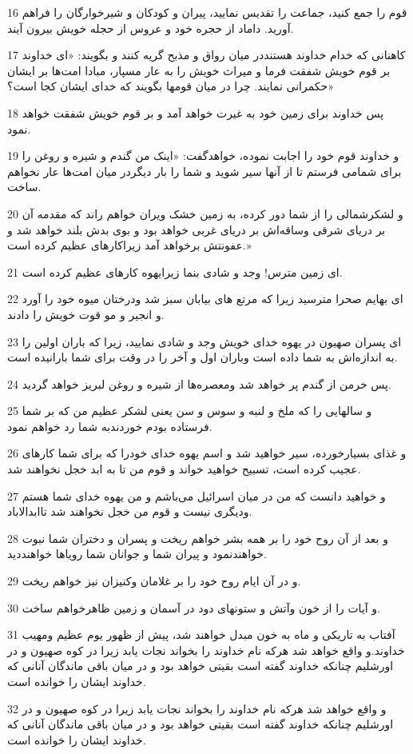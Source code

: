 \par 16 قوم را جمع کنید، جماعت را تقدیس نمایید، پیران و کودکان و شیرخوارگان را فراهم آورید. داماد از حجره خود و عروس از حجله خویش بیرون آیند.
\par 17 کاهنانی که خدام خداوند هستنددر میان رواق و مذبح گریه کنند و بگویند: «ای خداوند بر قوم خویش شفقت فرما و میراث خویش را به عار مسپار، مبادا امت‌ها بر ایشان حکمرانی نمایند. چرا در میان قومها بگویند که خدای ایشان کجا است؟»
\par 18 پس خداوند برای زمین خود به غیرت خواهد آمد و بر قوم خویش شفقت خواهد نمود.
\par 19 و خداوند قوم خود را اجابت نموده، خواهدگفت: «اینک من گندم و شیره و روغن را برای شمامی فرستم تا از آنها سیر شوید و شما را بار دیگردر میان امت‌ها عار نخواهم ساخت.
\par 20 و لشکرشمالی را از شما دور کرده، به زمین خشک ویران خواهم راند که مقدمه آن بر دریای شرقی وساقه‌اش بر دریای غربی خواهد بود و بوی بدش بلند خواهد شد و عفونتش برخواهد آمد زیراکارهای عظیم کرده است.»
\par 21 ‌ای زمین مترس! وجد و شادی بنما زیرایهوه کارهای عظیم کرده است.
\par 22 ‌ای بهایم صحرا مترسید زیرا که مرتع های بیابان سبز شد ودرختان میوه خود را آورد و انجیر و مو قوت خویش را دادند.
\par 23 ‌ای پسران صهیون در یهوه خدای خویش وجد و شادی نمایید، زیرا که باران اولین را به اندازه‌اش به شما داده است وباران اول و آخر را در وقت برای شما بارانیده است.
\par 24 پس خرمن از گندم پر خواهد شد ومعصره‌ها از شیره و روغن لبریز خواهد گردید.
\par 25 و سالهایی را که ملخ و لنبه و سوس و سن یعنی لشکر عظیم من که بر شما فرستاده بودم خوردندبه شما رد خواهم نمود.
\par 26 و غذای بسیارخورده، سیر خواهید شد و اسم یهوه خدای خودرا که برای شما کارهای عجیب کرده است، تسبیح خواهید خواند و قوم من تا به ابد خجل نخواهند شد.
\par 27 و خواهید دانست که من در میان اسرائیل می‌باشم و من یهوه خدای شما هستم ودیگری نیست و قوم من خجل نخواهند شد تاابدالاباد.
\par 28 و بعد از آن روح خود را بر همه بشر خواهم ریخت و پسران و دختران شما نبوت خواهندنمود و پیران شما و جوانان شما رویاها خواهنددید.
\par 29 و در آن ایام روح خود را بر غلامان وکنیزان نیز خواهم ریخت.
\par 30 و آیات را از خون وآتش و ستونهای دود در آسمان و زمین ظاهرخواهم ساخت.
\par 31 آفتاب به تاریکی و ماه به خون مبدل خواهند شد، پیش از ظهور یوم عظیم ومهیب خداوند.و واقع خواهد شد هر‌که نام خداوند را بخواند نجات یابد زیرا در کوه صهیون و در اورشلیم چنانکه خداوند گفته است بقیتی خواهد بود و در میان باقی ماندگان آنانی که خداوند ایشان را خوانده است.
\par 32 و واقع خواهد شد هر‌که نام خداوند را بخواند نجات یابد زیرا در کوه صهیون و در اورشلیم چنانکه خداوند گفته است بقیتی خواهد بود و در میان باقی ماندگان آنانی که خداوند ایشان را خوانده است.

